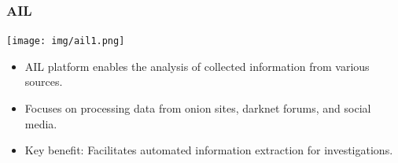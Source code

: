 \begin{frame}
    \frametitle{AIL}
    \begin{minipage}{0.45\textwidth} %
        \texttt{[image: img/ail1.png]}
    \end{minipage}%
    \hfill
    \begin{minipage}{0.5\textwidth} %
        \begin{itemize}
            \item AIL platform enables the analysis of collected information from various sources.
            \item Focuses on processing data from onion sites, darknet forums, and social media.
            \item Key benefit: Facilitates automated information extraction for investigations.
        \end{itemize}
    \end{minipage}
\end{frame}


